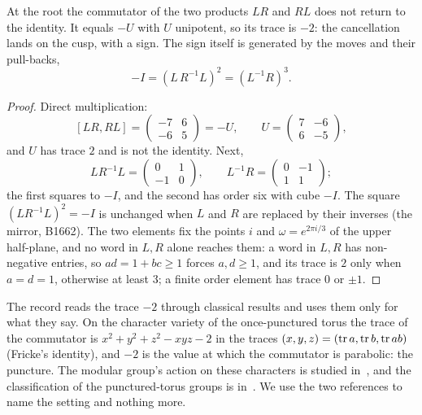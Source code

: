 \begin{proposition}\label{prop:sign}
At the root the commutator of the two products $LR$ and $RL$ does not return to the identity. It equals $-U$ with $U$
unipotent, so its trace is $-2$: the cancellation lands on the cusp, with a sign. The sign itself is generated by the
moves and their pull-backs,
\[
  -I=(L\,R^{-1}L)^2=(L^{-1}R)^3 .
\]
\end{proposition}
\begin{proof}
Direct multiplication:
\[
  [LR,RL]=\begin{pmatrix}-7&6\\-6&5\end{pmatrix}=-U,\qquad U=\begin{pmatrix}7&-6\\6&-5\end{pmatrix},
\]
and $U$ has trace $2$ and is not the identity. Next,
\[
  LR^{-1}L=\begin{pmatrix}0&1\\-1&0\end{pmatrix},\qquad L^{-1}R=\begin{pmatrix}0&-1\\1&1\end{pmatrix};
\]
the first squares to $-I$, and the second has order six with cube $-I$. The square $(LR^{-1}L)^2=-I$ is unchanged when
$L$ and $R$ are replaced by their inverses (the mirror, B1662). The two elements fix the points $i$ and $\omega=e^{2\pi i/3}$ of the
upper half-plane, and no word in $L,R$ alone reaches them: a word in $L,R$ has non-negative entries, so $ad=1+bc\ge1$
forces $a,d\ge1$, and its trace is $2$ only when $a=d=1$, otherwise at least $3$; a finite order element has trace $0$ or
$\pm1$.
\end{proof}

The record reads the trace $-2$ through classical results and uses them only for what they say. On the character
variety of the once-punctured torus the trace of the commutator is $x^2+y^2+z^2-xyz-2$ in the traces
$(x,y,z)=(\operatorname{tr} a,\operatorname{tr} b,\operatorname{tr} ab)$ (Fricke's identity), and $-2$ is the value at which the commutator is parabolic: the
puncture. The modular group's action on these characters is studied in~\cite{Goldman2003}, and the classification of
the punctured-torus groups is in~\cite{Minsky1999}. We use the two references to name the setting and nothing more.

